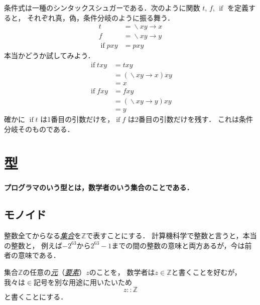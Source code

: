 \documentclass[a5paper,draft]{jsbook}
\newenvironment{leader}{\begingroup\bf}{\endgroup}
\newcommand{\keyword}[1]{{\underline{\emph{#1}}}}
\newcommand{\mathSpecialSet}[1]{\mathbb{#1}} %
\DeclareMathOperator{\mathLambda}{\backslash}
\DeclareMathOperator{\mathIfFunc}{if}
\newcommand{\mathIn}{\mathrel{::}}
\newcommand{\mathLambdaArrow}{\rightarrow}
\newcommand{\mathLambdaExpression}[2]{\mathLambda#1\mathLambdaArrow#2}
\begin{document}
条件式は一種のシンタックスシュガーである．次のように関数 $t$, $f$, $\mathIfFunc$ を定義すると，
それぞれ真，偽，条件分岐のように振る舞う．
\begin{align}
t&=\mathLambdaExpression{xy}{x}\\
f&=\mathLambdaExpression{xy}{y}\\
\mathIfFunc pxy&=pxy
\end{align}
本当かどうか試してみよう．
\begin{align}
\mathIfFunc txy&=txy\\
&=\left(\mathLambdaExpression{xy}{x}\right)xy\\
&=x\\
\mathIfFunc fxy&=fxy\\
&=\left(\mathLambdaExpression{xy}{y}\right)xy\\
&=y
\end{align}
確かに $\mathIfFunc t$ は1番目の引数だけを，$\mathIfFunc f$ は2番目の引数だけを残す．
これは条件分岐そのものである．


\chapter{型}

\begin{leader}
プログラマのいう型とは，数学者のいう集合のことである．
\end{leader}

\section{モノイド}

整数全てからなる\keyword{集合}を$\mathSpecialSet{Z}$で表すことにする．
計算機科学で整数と言うと，本当の整数と，
例えば$-2^{63}$から$2^{63}-1$までの間の整数の意味と両方あるが，今は前者の意味である．

集合$\mathSpecialSet{Z}$の任意の\keyword{元}（\keyword{要素}）$z$のことを，
数学者は$z\in\mathSpecialSet{Z}$と書くことを好むが，
我々は$\in$記号を別な用途に用いたいため
\begin{equation}
\label{eq:totality}
z\mathIn\mathSpecialSet{Z}
\end{equation}
と書くことにする．
\end{document}
